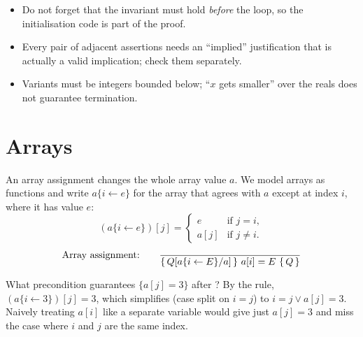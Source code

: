 \begin{important}[Pitfalls]
\begin{itemize}
  \item Do not forget that the invariant must hold \emph{before} the loop, so the
        initialisation code is part of the proof.
  \item Every pair of adjacent assertions needs an ``implied'' justification that is
        actually a valid implication; check them separately.
  \item Variants must be integers bounded below; ``$x$ gets smaller'' over the reals does
        not guarantee termination.
\end{itemize}
\end{important}

\section{Arrays}

An array assignment  changes the whole array value $a$. We model arrays as
functions and write $a\{i\leftarrow e\}$ for the array that agrees with $a$ except at
index $i$, where it has value $e$:
\[
(a\{i\leftarrow e\})[j]=\begin{cases}e & \text{if } j=i,\\ a[j] & \text{if } j\ne i.\end{cases}
\]
\[
\text{Array assignment:}\qquad \dfrac{}{\{\,Q[a\{i\leftarrow E\}/a]\,\}\ a[i] = E\ \{\,Q\,\}}
\]

\begin{example}[Aliasing]
What precondition guarantees $\{a[j]=3\}$ after ? By the rule,
$(a\{i\leftarrow3\})[j]=3$, which simplifies (case split on $i=j$) to
$i=j\lor a[j]=3$. Naively treating $a[i]$ like a separate variable would give just
$a[j]=3$ and miss the case where $i$ and $j$ are the same index.
\end{example}

